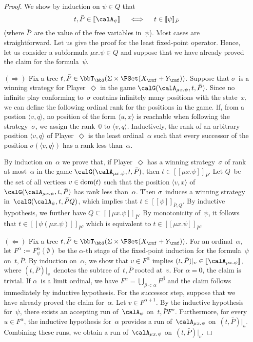 \documentclass[10pt, fleqn]{scrartcl}
\DeclareRobustCommand*{\dom}{\qopname\relax o{dom}}
\newcommand*{\?}{\kern .08em}
\newcommand\lsem{[\![}
\newcommand\rsem{]\!]}
\begin{document}
\begin{proof}
We show by induction on $\psi \in Q$ that
\begin{align*}
  t,\bar P \in \lsem\calA_\psi\rsem
  \quad\iff\quad
  t \in \lsem\psi\rsem_{\bar P}
\end{align*}
(where $\bar P$~are the value of the free variables in~$\psi$).
Most cases are straightforward.
Let us give the proof for the least fixed-point operator.
Hence, let us consider a subformula $\mu x.\psi \in Q$ and
suppose that we have already proved the claim for the formula~$\psi$.

$(\Rightarrow)$
Fix a tree $t,\bar P \in \bbT_\bbS(\Sigma \times \PSet(X_\rmf + Y_\rmf))$.
Suppose that $\sigma$~is a winning strategy for Player~$\Diamond$ in the game
$\calG(\calA_{\mu x.\psi},t,\bar P)$. Since no infinite play conforming to~$\sigma$ contains
infinitely many positions with the state~$x$, we can define the following ordinal rank for
the positions in the game. If, from a postion $\langle v,q\rangle$, no position of the form
$\langle u,x\rangle$ is reachable when following the strategy~$\sigma$, we assign the rank~$0$
to $\langle v,q\rangle$. Inductively, the rank of an arbitrary position $\langle v,q\rangle$
of Player~$\Diamond$ is the least ordinal~$\alpha$ such that every successor of the position
$\sigma(\langle v,q\rangle)$ has a rank less than~$\alpha$.

By induction on~$\alpha$ we prove that, if Player~$\Diamond$ has a winning strategy~$\sigma$
of rank at most~$\alpha$ in the game $\calG(\calA_{\mu x.\psi},t,\bar P)$, then
$t \in \lsem\mu x.\psi\rsem_{\bar P}$. Let $Q$~be the set of all vertices $v \in \dom(t)$
such that the position $\langle v,x\rangle$ of $\calG(\calA_{\mu x.\psi},t,\bar P)$ has
rank less than~$\alpha$. Then $\sigma$~induces a winning strategy
in~$\calG(\calA_\psi,t,\bar PQ)$, which implies that $t \in \lsem\psi\rsem_{\bar P,Q}$.
By inductive hypothesis, we further have $Q \subseteq \lsem\mu x.\psi\rsem_{\bar P}$.
By monotonicity of~$\psi$, it follows that $t \in \lsem\psi(\mu x.\psi)\rsem_{\bar P}$,
which is equivalent to $t \in \lsem\mu x.\psi\rsem_{\bar P}$,

$(\Leftarrow)$
Fix a tree $t,\bar P \in \bbT_\bbS(\Sigma \times \PSet(X_\rmf + Y_\rmf))$.
For an ordinal~$\alpha$, let $F^\alpha := F_\psi^\alpha(\emptyset)$ be the $\alpha$-th
stage of the fixed-point induction for the formula~$\psi$ on~$t,\bar P$.
By induction on~$\alpha$, we show that $v \in F^\alpha$ implies
$(t,\bar P)|_v \in \lsem\calA_{\mu x.\psi}\rsem$,
where $(t,\bar P)|_v$~denotes the subtree of~$t,\bar P$ rooted at~$v$.
For $\alpha = 0$, the claim is trivial.
If $\alpha$~is a limit ordinal, we have $F^\alpha = \bigcup_{\beta<\alpha} F^\beta$
and the claim follows immediately by inductive hypothesis.
For the successor step, suppose that we have already proved the claim for~$\alpha$.
Let $v \in F^{\alpha+1}$.
By the inductive hypothesis for~$\psi$, there exists an accepting run of~$\calA_\psi$
on~$t,\bar PF^\alpha$.
Furthermore, for every $u \in F^\alpha$, the inductive hypothesis for~$\alpha$ provides a run
of~$\calA_{\mu x.\psi}$ on~$(t,\bar P)|_u$. Combining these runs, we obtain a run
of~$\calA_{\mu x.\psi}$ on~$(t,\bar P)|_v$.
\end{proof}
\end{document}
